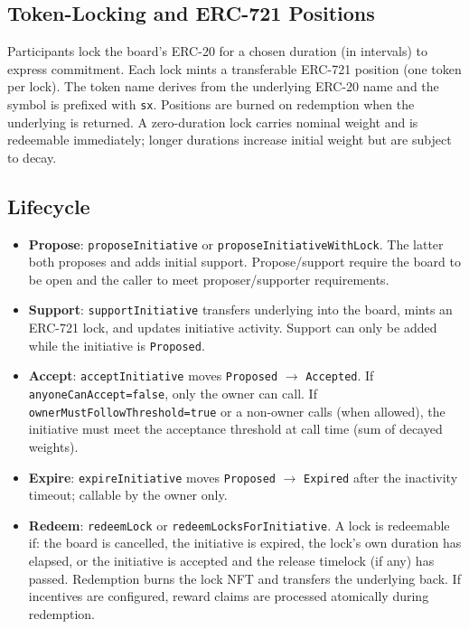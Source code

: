 \subsection{Token-Locking and ERC-721 Positions}
Participants lock the board's ERC-20 for a chosen duration (in intervals) to express commitment. Each lock mints a transferable ERC-721 position (one token per lock). The token name derives from the underlying ERC-20 name and the symbol is prefixed with \texttt{sx}. Positions are burned on redemption when the underlying is returned. A zero-duration lock carries nominal weight and is redeemable immediately; longer durations increase initial weight but are subject to decay.

\subsection{Lifecycle}
\begin{itemize}[leftmargin=*]
  \item \textbf{Propose}: \texttt{proposeInitiative} or \texttt{proposeInitiativeWithLock}. The latter both proposes and adds initial support. Propose/support require the board to be open and the caller to meet proposer/supporter requirements.
  \item \textbf{Support}: \texttt{supportInitiative} transfers underlying into the board, mints an ERC-721 lock, and updates initiative activity. Support can only be added while the initiative is \texttt{Proposed}.
  \item \textbf{Accept}: \texttt{acceptInitiative} moves \texttt{Proposed} \(\rightarrow\) \texttt{Accepted}. If \texttt{anyoneCanAccept=false}, only the owner can call. If \texttt{ownerMustFollowThreshold=true} or a non-owner calls (when allowed), the initiative must meet the acceptance threshold at call time (sum of decayed weights).
  \item \textbf{Expire}: \texttt{expireInitiative} moves \texttt{Proposed} \(\rightarrow\) \texttt{Expired} after the inactivity timeout; callable by the owner only.
  \item \textbf{Redeem}: \texttt{redeemLock} or \texttt{redeemLocksForInitiative}. A lock is redeemable if: the board is cancelled, the initiative is expired, the lock's own duration has elapsed, or the initiative is accepted and the release timelock (if any) has passed. Redemption burns the lock NFT and transfers the underlying back. If incentives are configured, reward claims are processed atomically during redemption.
\end{itemize}

